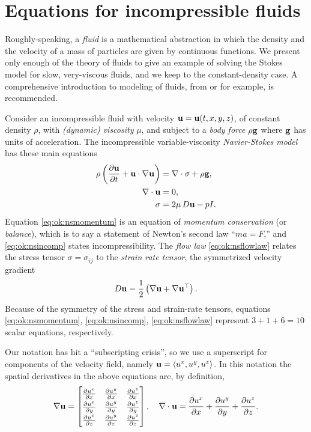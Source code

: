 
\section{Equations for incompressible fluids}

Roughly-speaking, a \emph{fluid} is a mathematical abstraction in which the density and the velocity of a mass of particles are given by continuous functions.  We present only enough of the theory of fluids to give an example of solving the Stokes model for slow, very-viscous fluids, and we keep to the constant-density case.  A comprehensive introduction to modeling of fluids, from \citep{Acheson1990} or \citep{Fowler1997} for example, is recommended.

Consider an incompressible fluid with velocity $\mathbf{u}=\mathbf{u}(t,x,y,z)$, of constant density $\rho$, with \emph{(dynamic) viscosity} $\mu$, and subject to a \emph{body force} $\rho \mathbf{g}$ where $\mathbf{g}$ has units of acceleration.  The incompressible variable-viscosity \emph{Navier-Stokes model} has these main equations
\begin{align}
\rho \left(\frac{\partial \mathbf{u}}{\partial t} + \mathbf{u} \cdot \nabla \mathbf{u}\right) &= \nabla\cdot \sigma + \rho \mathbf{g}, \label{eq:ok:nsmomentum} \\
\nabla\cdot \mathbf{u} &= 0, \label{eq:ok:nsincomp} \\
\sigma &= 2 \mu\, D \mathbf{u} - p I. \label{eq:ok:nsflowlaw}
\end{align}
Equation \eqref{eq:ok:nsmomentum} is an equation of \emph{momentum conservation} (or \emph{balance}), which is to say a statement of Newton's second law ``$ma=F$,'' and \eqref{eq:ok:nsincomp} states incompressibility.  The \emph{flow law} \eqref{eq:ok:nsflowlaw} relates the stress tensor $\sigma=\sigma_{ij}$ to the \emph{strain rate tensor}, the symmetrized velocity gradient
    $$D \mathbf{u} = \frac{1}{2} \left(\nabla \mathbf{u} + \nabla \mathbf{u}^{\top}\right).$$
Because of the symmetry of the stress and strain-rate tensors, equations \eqref{eq:ok:nsmomentum}, \eqref{eq:ok:nsincomp}, \eqref{eq:ok:nsflowlaw} represent $3+1+6=10$ scalar equations, respectively.

Our notation has hit a ``subscripting crisis'', so we use a superscript for components of the velocity field, namely $\mathbf{u} = \left<u^x,u^y,u^z\right>$.  In this notation the spatial derivatives in the above equations are, by definition,
\begin{equation}
\grad \bu = \renewcommand{\arraystretch}{1.3}\begin{bmatrix}
    \frac{\partial u^x}{\partial x} & \frac{\partial u^y}{\partial x} & \frac{\partial u^z}{\partial x} \\
    \frac{\partial u^x}{\partial y} & \frac{\partial u^y}{\partial y} & \frac{\partial u^z}{\partial y} \\
    \frac{\partial u^x}{\partial z} & \frac{\partial u^y}{\partial z} & \frac{\partial u^z}{\partial z}
    \end{bmatrix}, \quad
\Div \bu = \frac{\partial u^x}{\partial x} + \frac{\partial u^y}{\partial y} + \frac{\partial u^z}{\partial z}. \label{eq:ok:graddivudefinition}
\end{equation}

